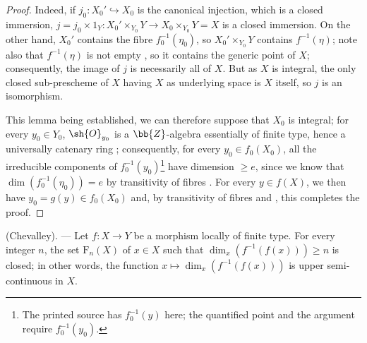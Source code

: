 \begin{proof}
Indeed, if $j_0:X_0'\hookrightarrow X_0$ is the canonical injection, which is a closed immersion, $j=j_0\times 1_Y:X_0'\times_{Y_0}Y\to X_0\times_{Y_0}Y=X$ is a closed immersion.
On the other hand, $X_0'$ contains the fibre $f_0^{-1}(\eta_0)$, so $X_0'\times_{Y_0}Y$ contains $f^{-1}(\eta)$; note also that $f^{-1}(\eta)$ is not empty , so it contains the generic point of $X$; consequently, the image of $j$ is necessarily all of $X$.
But as $X$ is integral, the only closed sub-prescheme of $X$ having $X$ as underlying space is $X$ itself, so $j$ is an isomorphism.

This lemma being established, we can therefore suppose that $X_0$ is integral; for every $y_0\in Y_0$, $\sh{O}_{y_0}$ is a $\bb{Z}$-algebra essentially of finite type, hence a universally
catenary ring ; consequently, for every $y_0\in f_0(X_0)$, all the irreducible components of $f_0^{-1}(y_0)$\footnote{The printed source has $f_0^{-1}(y)$ here; the quantified point and the argument require $f_0^{-1}(y_0)$.} have dimension $\geq e$, since we know that $\dim(f_0^{-1}(\eta_0))=e$ by transitivity of fibres .
For every $y\in f(X)$, we then have $y_0=g(y)\in f_0(X_0)$ and, by transitivity of fibres and , this completes the proof.
\end{proof}

\begin{theorem}[13.1.3]
\label{IV.13.1.3}
\textnormal{(Chevalley).} ---
Let $f:X\to Y$ be a morphism locally of finite type.
For every integer $n$, the set $\mathrm{F}_n(X)$ of $x\in X$ such that $\dim_x(f^{-1}(f(x)))\geq n$ is closed; in other words, the function $x\mapsto\dim_x(f^{-1}(f(x)))$ is upper semi-continuous in $X$.
\end{theorem}


